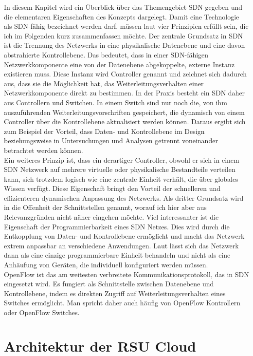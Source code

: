 \documentclass[conference]{IEEEtran}
\begin{document}
In diesem Kapitel wird ein Überblick über das Themengebiet SDN gegeben und die elementaren Eigenschaften des Konzepts dargelegt. Damit eine Technologie als SDN-fähig bezeichnet werden darf, müssen laut \cite{IEEEhowto:sdn} vier Prinzipien erfüllt sein, die ich im Folgenden kurz zusammenfassen möchte. Der zentrale Grundsatz in SDN ist die Trennung des Netzwerks in eine physikalische Datenebene und eine davon abstrahierte Kontrollebene. Das bedeutet, dass in einer SDN-fähigen Netzwerkkomponente eine von der Datenebene abgekoppelte, externe Instanz existieren muss. Diese Instanz wird Controller genannt und zeichnet sich dadurch aus, dass sie die Möglichkeit hat, das Weiterleitungsverhalten einer Netzwerkkomponente direkt zu bestimmen. In der Praxis besteht ein SDN daher aus Controllern und Switchen. In einem Switch sind nur noch die, von ihm auszuführenden Weiterleitungsvorschriften gespeichert, die dynamisch von einem Controller über die Kontrollebene aktualisiert werden können. Daraus ergibt sich zum Beispiel der Vorteil, dass Daten- und Kontrollebene im Design beziehungsweise in Untersuchungen und Analysen getrennt voneinander betrachtet werden können. \\
Ein weiteres Prinzip ist, dass ein derartiger Controller, obwohl er sich in einem SDN Netzwerk auf mehrere virtuelle oder physikalische Bestandteile verteilen kann, sich trotzdem logisch wie eine zentrale Einheit verhält, die über globales Wissen verfügt. Diese Eigenschaft bringt den Vorteil der schnelleren und effizienteren dynamischen Anpassung des Netzwerks.
Als dritter Grundsatz wird in \cite{IEEEhowto:sdn} die Offenheit der Schnittstellen genannt, worauf ich hier aber aus Relevanzgründen nicht näher eingehen möchte. Viel interessanter ist die Eigenschaft der Programmierbarkeit eines SDN Netzes. Dies wird durch die Entkopplung von Daten- und Kontrollebene ermöglicht und macht das Netzwerk extrem anpassbar an verschiedene Anwendungen. Laut \cite{IEEEhowto:sdn} lässt sich das Netzwerk dann als eine einzige programmierbare Einheit behandeln und nicht als eine Anhäufung von Geräten, die individuell konfiguriert werden müssen.\\
OpenFlow ist das am weitesten verbreitete Kommunikationsprotokoll, das in SDN eingesetzt wird. Es fungiert als Schnittstelle zwischen Datenebene und Kontrollebene, indem es direkten Zugriff auf Weiterleitungsverhalten eines Switches ermöglicht. Man spricht daher auch häufig von OpenFlow Kontrollern oder OpenFlow Switches. 


\section{Architektur der RSU Cloud}
\end{document}
